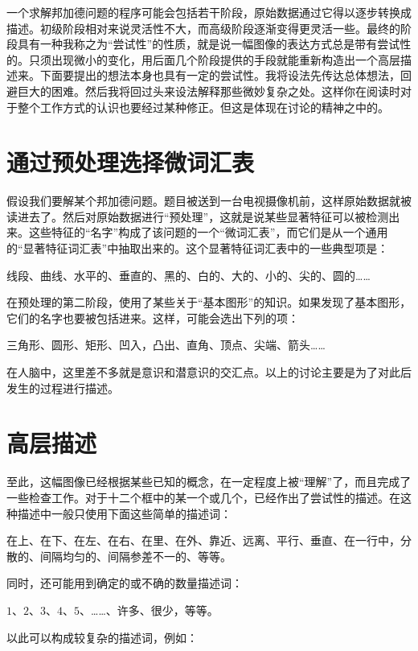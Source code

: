 一个求解邦加德问题的程序可能会包括若干阶段，原始数据通过它得以逐步转换成描述。初级阶段相对来说灵活性不大，而高级阶段逐渐变得更灵活一些。最终的阶段具有一种我称之为“尝试性”的性质，就是说一幅图像的表达方式总是带有尝试性的。只须出现微小的变化，用后面几个阶段提供的手段就能重新构造出一个高层描述来。下面要提出的想法本身也具有一定的尝试性。我将设法先传达总体想法，回避巨大的困难。然后我将回过头来设法解释那些微妙复杂之处。这样你在阅读时对于整个工作方式的认识也要经过某种修正。但这是体现在讨论的精神之中的。

\section{通过预处理选择微词汇表}

假设我们要解某个邦加德问题。题目被送到一台电视摄像机前，这样原始数据就被读进去了。然后对原始数据进行“预处理”，这就是说某些显著特征可以被检测出来。这些特征的“名字”构成了该问题的一个“微词汇表”，而它们是从一个通用的“显著特征词汇表”中抽取出来的。这个显著特征词汇表中的一些典型项是：

\begin{block}
线段、曲线、水平的、垂直的、黑的、白的、大的、小的、尖的、圆的……
\end{block}

在预处理的第二阶段，使用了某些关于“基本图形”的知识。如果发现了基本图形，它们的名字也要被包括进来。这样，可能会选出下列的项：

\begin{block}
三角形、圆形、矩形、凹入，凸出、直角、顶点、尖端、箭头……
\end{block}

在人脑中，这里差不多就是意识和潜意识的交汇点。以上的讨论主要是为了对此后发生的过程进行描述。

\section{高层描述}

至此，这幅图像已经根据某些已知的概念，在一定程度上被“理解”了，而且完成了一些检查工作。对于十二个框中的某一个或几个，已经作出了尝试性的描述。在这种描述中一般只使用下面这些简单的描述词：

\begin{block}
在上、在下、在左、在右、在里、在外、靠近、远离、平行、垂直、在一行中，分散的、间隔均匀的、间隔参差不一的、等等。
\end{block}
同时，还可能用到确定的或不确的数量描述词：

\begin{block}
$1$、$2$、$3$、$4$、$5$、……、许多、很少，等等。
\end{block}
以此可以构成较复杂的描述词，例如：

